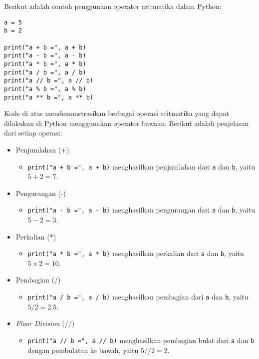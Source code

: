Berikut adalah contoh penggunaan operator aritmatika dalam Python:
\begin{lstlisting}[style=PythonStyle, caption={Kode Python: arithmetic_operator.py}]
a = 5
b = 2

print("a + b =", a + b)
print("a - b =", a - b)
print("a * b =", a * b)
print("a / b =", a / b)
print("a // b =", a // b)
print("a % b =", a % b)
print("a ** b =", a ** b)
\end{lstlisting}

Kode di atas mendemonstrasikan berbagai operasi aritmatika yang dapat dilakukan di Python menggunakan operator bawaan. Berikut adalah penjelasan dari setiap operasi:
\begin{itemize}
    \item Penjumlahan (+)
    \begin{itemize}
        \item \texttt{print("a + b =", a + b)} menghasilkan penjumlahan dari \texttt{a} dan \texttt{b}, yaitu $5 + 2 = 7$.
    \end{itemize}

    \item Pengurangan (-)
    \begin{itemize}
        \item \texttt{print("a - b =", a - b)} menghasilkan pengurangan dari \texttt{a} dan \texttt{b}, yaitu $5 - 2 = 3$.
    \end{itemize}

    \item Perkalian (*)
    \begin{itemize}
        \item \texttt{print("a * b =", a * b)} menghasilkan perkalian dari \texttt{a} dan \texttt{b}, yaitu $5 \times 2 = 10$.
    \end{itemize}

    \item Pembagian (/)
    \begin{itemize}
        \item \texttt{print("a / b =", a / b)} menghasilkan pembagian dari \texttt{a} dan \texttt{b}, yaitu $5 / 2 = 2.5$.
    \end{itemize}

    \item \textit{Floor Division} (//)
    \begin{itemize}
        \item \texttt{print("a // b =", a // b)} menghasilkan pembagian bulat dari \texttt{a} dan \texttt{b} dengan pembulatan ke bawah, yaitu $5 // 2 = 2$.
    \end{itemize}


\end{itemize}
